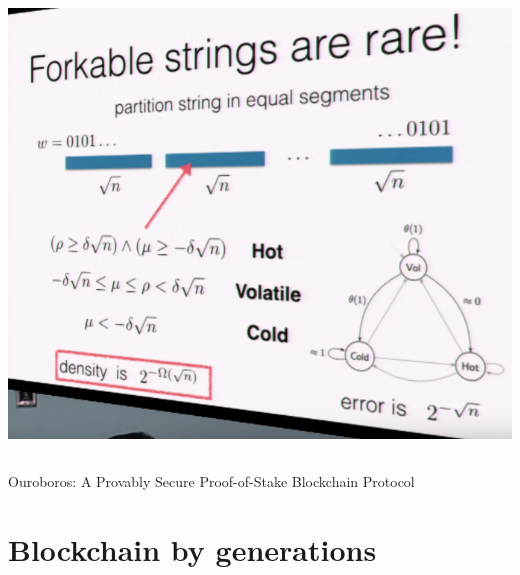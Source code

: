 \documentclass[notitlepage, usenames,dvipsnames]{beamer}
\begin{document}
\begin{frame}
\begin{overlayarea}{\textwidth}{0.85\textheight}
{\begin{columns}[c]
                \includegraphics[scale=0.255]{../img/ouroboros-2.png}
            \end{columns}
            \vspace{1ex}
            {\footnotesize Ouroboros: A Provably Secure Proof-of-Stake Blockchain Protocol}}

        \end{overlayarea}
    \end{frame}


    \section{Blockchain by generations}
\end{document}

